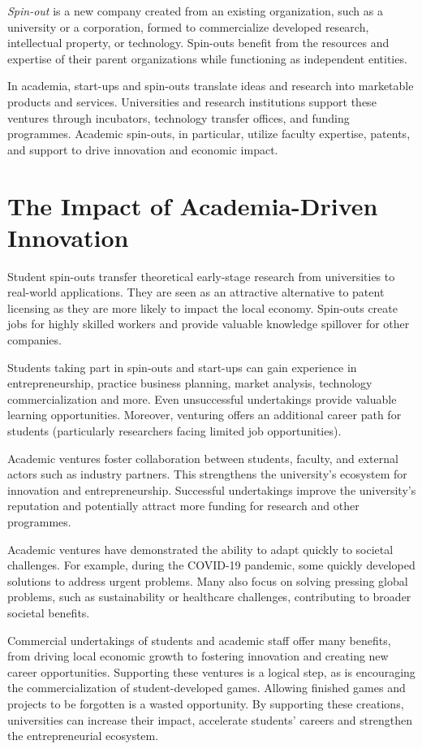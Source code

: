 \textit{Spin-out} is a new company created from an existing organization, such as a university or a corporation, formed to commercialize developed research, intellectual property, or technology. Spin-outs benefit from the resources and expertise of their parent organizations while functioning as independent entities.

In academia, start-ups and spin-outs translate ideas and research into marketable products and services. Universities and research institutions support these ventures through incubators, technology transfer offices, and funding programmes. Academic spin-outs, in particular, utilize faculty expertise, patents, and support to drive innovation and economic impact.

\section{The Impact of Academia-Driven Innovation}
Student spin-outs transfer theoretical early-stage research from universities to real-world applications. They are seen as an attractive alternative to patent licensing as they are more likely to impact the local economy. Spin-outs create jobs for highly skilled workers and provide valuable knowledge spillover for other companies.

Students taking part in spin-outs and start-ups can gain experience in entrepreneurship, practice business planning, market analysis, technology commercialization and more. Even unsuccessful undertakings provide valuable learning opportunities. Moreover, venturing offers an additional career path for students (particularly researchers facing limited job opportunities).

Academic ventures foster collaboration between students, faculty, and external actors such as industry partners. This strengthens the university's ecosystem for innovation and entrepreneurship. Successful undertakings improve the university's reputation and potentially attract more funding for research and other programmes.

Academic ventures have demonstrated the ability to adapt quickly to societal challenges. For example, during the COVID-19 pandemic, some quickly developed solutions to address urgent problems. Many also focus on solving pressing global problems, such as sustainability or healthcare challenges, contributing to broader societal benefits.

Commercial undertakings of students and academic staff offer many benefits, from driving local economic growth to fostering innovation and creating new career opportunities. Supporting these ventures is a logical step, as is encouraging the commercialization of student-developed games. Allowing finished games and projects to be forgotten is a wasted opportunity. By supporting these creations, universities can increase their impact, accelerate students' careers and strengthen the entrepreneurial ecosystem.

